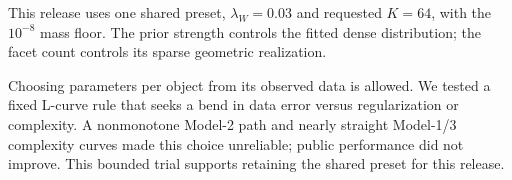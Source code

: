 This release uses one shared preset, $\lambda_W=0.03$ and requested $K=64$, with the $10^{-8}$ mass floor. The prior strength controls the fitted dense distribution; the facet count controls its sparse geometric realization.

Choosing parameters per object from its observed data is allowed. We tested a fixed L-curve rule that seeks a bend in data error versus regularization or complexity. A nonmonotone Model-2 path and nearly straight Model-1/3 complexity curves made this choice unreliable; public performance did not improve. This bounded trial supports retaining the shared preset for this release.
